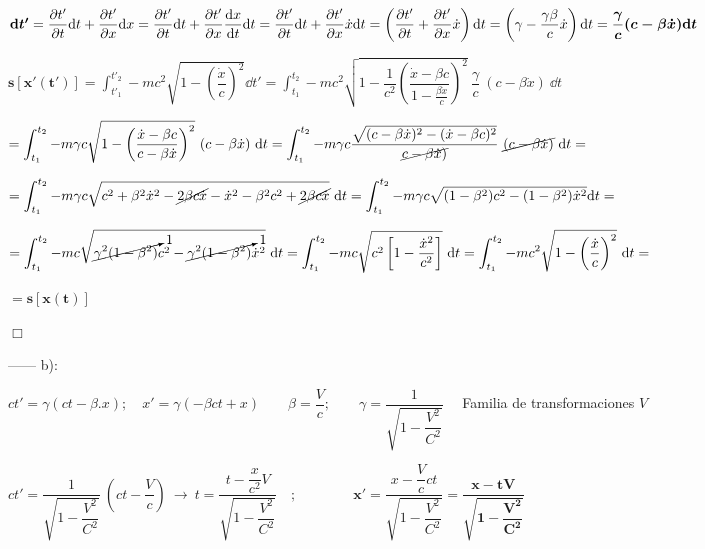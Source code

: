 $\boldsymbol{ \dd t'}=\displaystyle \pdv{t'}{t}\dd t + \pdv{t'}{x} \dd x=
\pdv{t'}{t}\dd t + \pdv{t'}{x} \dv{x}{t} \dd t= \pdv{t'}{t}\dd t + \pdv{t'}{x} \dot x \dd t= \left( \pdv{t'}{t}+\pdv{t'}{x} \dot x \right) \dd t= \left( \gamma - \dfrac{\gamma \beta}{c} \dot x \right) \dd t=\boldsymbol{\dfrac \gamma c (c-\beta \dot x) \dd t}$
 
\vspace{3mm}
$\boldsymbol{s[x'(t')]}= \displaystyle \int_{t'_1}^{t'_2} -mc^2 \sqrt{1-\left( \dfrac {\dot x}{c}\right)^2 } \dd t'= \int_{t_1}^{t_2} -mc^2 \sqrt{1-\dfrac 1{c^2} \left( \dfrac{\dot x-\beta c}{1-\frac {\beta \dot x}{c}} \right)^2}\ \dfrac \gamma c \ (c-\beta \dot x) \ \dd t$

$\displaystyle= \int_{t_1}^{t_2} -m\gamma c \sqrt{1-\left(\dfrac{\dot x-\beta c}{c-\beta \dot x}\right)^2 } \ (c-\beta \dot x) \ \dd t 
=\int_{t_1}^{t_2} -m\gamma c \dfrac{\sqrt{(c-\beta \dot x)^2-(\dot x-\beta c)^2}}{\cancel{c-\beta \dot x)}} \ \cancel{(c-\beta \dot x)} \ \dd t=$
 
$\displaystyle= \int_{t_1}^{t_2} -m\gamma c \sqrt{c^2+\beta^2 \dot x ^2 -\cancel{2\beta c \dot x} -\dot x^2 -\beta^2 c^2 + \cancel{2\beta c \dot x}} \ \dd t=\int_{t_1}^{t_2} -m\gamma c \sqrt{(1-\beta^2)c^2-(1-\beta^2)\dot x^2} \dd t=$

$=\displaystyle \int_{t_1}^{t_2}  -mc \sqrt{ \cancelto{1}{\gamma^2(1-\beta^2)} c^2  - \cancelto{1}{\gamma^2(1-\beta^2)} \dot x^2 } \ \dd t
= \int_{t_1}^{t_2} -mc \sqrt{c^2\left[ 1-\dfrac{\dot x^2}{c^2} 	\right]} \ \dd t =\int_{t_1}^{t_2} -mc^2  \sqrt{1-\left( \dfrac{\dot x}{c} \right)^2}\ \dd t = $

$=\boldsymbol{s[x(t)]}$

\vspace{-5mm}
\begin{flushright}
$\boldsymbol{ \Box } \ $	
\end{flushright}

\vspace{-5mm}
------ b):
\color{NavyBlue}

$ct'=\gamma (ct-\beta. x);\quad x'=\gamma(-\beta c t +x) \qquad \beta=\dfrac V c;	\qquad \gamma=\dfrac{1}{\sqrt{1-\dfrac {V^2}{C^2}}}\quad $ Familia de transformaciones $V$

$ct'=\dfrac{1}{\sqrt{1-\dfrac {V^2}{C^2}}} \ \left(ct-\dfrac V c \right) \ \to \ t=\dfrac{t-\dfrac x{c^2} V}{\sqrt{1-\dfrac {V^2}{C^2}}}\quad ;  \qquad \qquad \boldsymbol{x'}=\dfrac{x-\dfrac V c ct}{\sqrt{1-\dfrac {V^2}{C^2}}}=\boldsymbol{\dfrac{x-tV}{\sqrt{1-\dfrac {V^2}{C^2}}}}$

